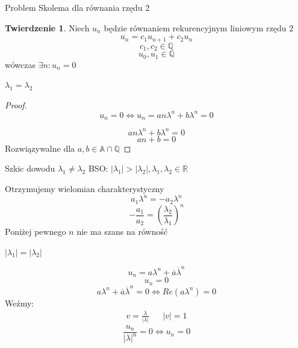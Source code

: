 \documentclass[handout]{beamer}
\def\Q{\mathbb{Q}}
\def\A{\mathbb{A}}
\theoremstyle{definition}
\newtheorem*{twierdzenie}{Twierdzenie}
\theoremstyle{named}
\begin{document}
\begin{frame}{Problem Skolema dla równania rzędu 2}


\begin{twierdzenie}
    Niech $u_n$ będzie równaniem rekurencyjnym liniowym rzędu 2
    $$
        u_n = c_1 u_{n+1} + c_2 u_n
    $$
    $$
        c_1, c_2 \in \mathbb{Q}
    $$
    $$
        u_0, u_1 \in \mathbb{Q}
    $$
    wówczas $\exists n : u_n = 0$
\end{twierdzenie}

\end{frame}

\begin{frame}{$\lambda_1= \lambda_2$}

\begin{proof}
    $$u_n = 0 \iff  u_n = a n \lambda^{n} + b \lambda^{n} = 0$$
    
    $$ a n \lambda^{n} + b \lambda^{n} = 0 $$
    $$ a n + b = 0 $$
    Rozwiązywalne dla $a, b \in \A \cap \Q $
\end{proof}

    
\end{frame}

\begin{frame}{Szkic dowodu $\lambda_1 \neq \lambda_2$}
    BSO: 
    $|\lambda_1| > |\lambda_2|, \lambda_1, \lambda_2 \in \mathbb{R}$
    
    Otrzymujemy wielomian charakterystyczny 
    $$
       a_1 \lambda^{n} = - a_2 \lambda^{n}
    $$
    $$
        - \frac{a_1}{a_2} = (\frac{\lambda_2}{\lambda_1})^{n}
    $$
    Poniżej pewnego $n$ nie ma szans na równość 
\end{frame}

\begin{frame}{$|\lambda_1| = |\lambda_2|$}

\begin{equation*}
    u_n = a \lambda^{n} + \overline{a} \overline{\lambda}^{n} 
\end{equation*}
\pause 
\begin{equation*}
    u_n = 0 
\end{equation*}
\pause 
\begin{equation*}
    a \lambda^{n} + \overline{a} \overline{\lambda}^{n} = 0 \iff Re(a {\lambda^{n}}) = 0 
\end{equation*} 
\pause
Weźmy: 
\begin{align*}
    v = \frac{\lambda}{|\lambda|} && |v| = 1
\end{align*}
$$\frac{u_n}{|\lambda|^{n}} = 0 \iff u_n = 0$$

\end{frame}
    
\end{document}

